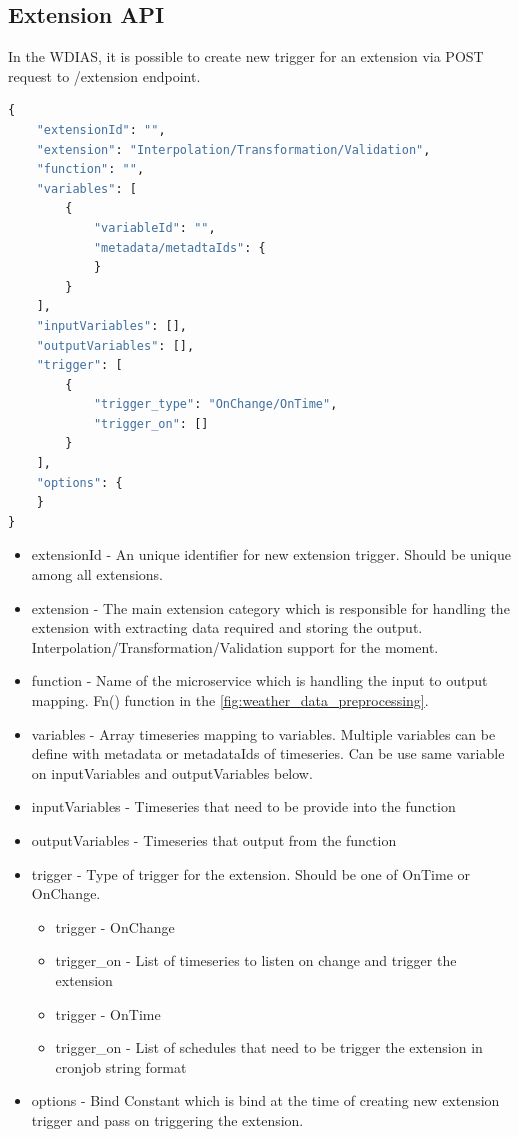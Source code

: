 \subsection{Extension API}
In the WDIAS, it is possible to create new trigger for an extension via POST request to /extension endpoint.
\begin{lstlisting}[language=Python]
{
    "extensionId": "",
    "extension": "Interpolation/Transformation/Validation",
    "function": "",
    "variables": [
        {
            "variableId": "",
            "metadata/metadtaIds": {
            }
        }
    ],
    "inputVariables": [],
    "outputVariables": [],
    "trigger": [
        {
            "trigger_type": "OnChange/OnTime",
            "trigger_on": []
        }
    ],
    "options": {
    }
}
\end{lstlisting}
\begin{itemize}
    \item extensionId - An unique identifier for new extension trigger. Should be unique among all extensions.
    \item extension - The main extension category which is responsible for handling the extension with extracting data required and storing the output. Interpolation/Transformation/Validation support for the moment.
    \item function - Name of the microservice which is handling the input to output mapping. Fn() function in the \ref{fig:weather_data_preprocessing}.
    \item variables - Array timeseries mapping to variables. Multiple variables can be define with metadata or metadataIds of timeseries. Can be use same variable on inputVariables and outputVariables below.
    \item inputVariables - Timeseries that need to be provide into the function
    \item outputVariables - Timeseries that output from the function
    \item trigger - Type of trigger for the extension. Should be one of OnTime or OnChange.
    \begin{itemize}
        \item trigger - OnChange
        \item trigger\_on - List of timeseries to listen on change and trigger the extension
    \end{itemize}
    \begin{itemize}
        \item trigger - OnTime
        \item trigger\_on - List of schedules that need to be trigger the extension in cronjob string format
    \end{itemize}
    \item options - Bind Constant which is bind at the time of creating new extension trigger and pass on triggering the extension.
\end{itemize}


